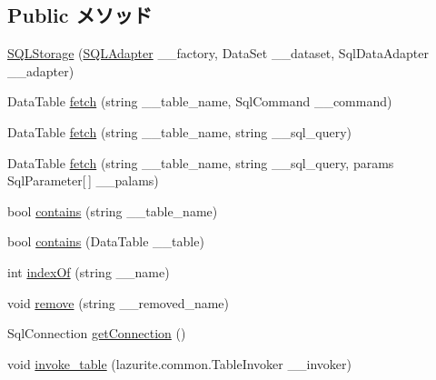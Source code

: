 \subsection*{Public メソッド}
\begin{DoxyCompactItemize}
\item 
\hyperlink{classlazurite_1_1relation_1_1sqlclient_1_1_s_q_l_storage_a3352630f64bb6e7bcb4c1aed5cbec745}{SQLStorage} (\hyperlink{interfacelazurite_1_1relation_1_1sqlclient_1_1_s_q_l_adapter}{SQLAdapter} \_\-\_\-factory, DataSet \_\-\_\-dataset, SqlDataAdapter \_\-\_\-adapter)
\item 
DataTable \hyperlink{classlazurite_1_1relation_1_1sqlclient_1_1_s_q_l_storage_ab02cfadf22bbfed1c30cc70463161293}{fetch} (string \_\-\_\-table\_\-name, SqlCommand \_\-\_\-command)
\item 
DataTable \hyperlink{classlazurite_1_1relation_1_1sqlclient_1_1_s_q_l_storage_a9c45c2be1c07d8c13d735dfc62a765c3}{fetch} (string \_\-\_\-table\_\-name, string \_\-\_\-sql\_\-query)
\item 
DataTable \hyperlink{classlazurite_1_1relation_1_1sqlclient_1_1_s_q_l_storage_a7119dd1b3a9d48005c7f44132fb2c0c3}{fetch} (string \_\-\_\-table\_\-name, string \_\-\_\-sql\_\-query, params SqlParameter\mbox{[}$\,$\mbox{]} \_\-\_\-palams)
\item 
bool \hyperlink{classlazurite_1_1relation_1_1sqlclient_1_1_s_q_l_storage_a57c78a427b2cb14056772f1239d3b45c}{contains} (string \_\-\_\-table\_\-name)
\item 
bool \hyperlink{classlazurite_1_1relation_1_1sqlclient_1_1_s_q_l_storage_a6e19d27b72776440160c0cc3a5b17795}{contains} (DataTable \_\-\_\-table)
\item 
int \hyperlink{classlazurite_1_1relation_1_1sqlclient_1_1_s_q_l_storage_a51138a6b8e2e5c1c30b92a0eb02c0550}{indexOf} (string \_\-\_\-name)
\item 
void \hyperlink{classlazurite_1_1relation_1_1sqlclient_1_1_s_q_l_storage_a00e7725dfa5e9758202a22b6a8f816db}{remove} (string \_\-\_\-removed\_\-name)
\item 
SqlConnection \hyperlink{classlazurite_1_1relation_1_1sqlclient_1_1_s_q_l_storage_a808b3cf0fa1b77858d07792d4a6c78d1}{getConnection} ()
\item 
void \hyperlink{classlazurite_1_1relation_1_1sqlclient_1_1_s_q_l_storage_a74de1ca5742b268f8d9bcaadfc88fa0f}{invoke\_\-table} (lazurite.common.TableInvoker \_\-\_\-invoker)
\end{DoxyCompactItemize}
